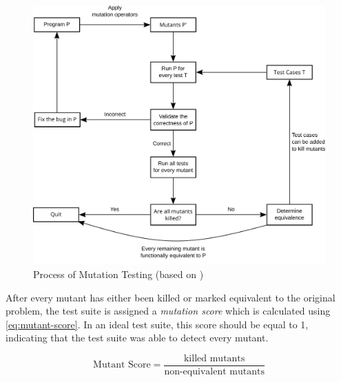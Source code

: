 \begin{figure}[htbp!]
	\centering
	\includegraphics[width=\textwidth]{assets/images/mutation-testing.pdf}
	\caption{Process of Mutation Testing (based on \cite{Offutt2001})}
	\label{fig:mutation-testing}
\end{figure}

\noindent After every mutant has either been killed or marked equivalent to the original problem, the test suite is assigned a \emph{mutation score} which is calculated using \autoref{eq:mutant-score}. In an ideal test suite, this score should be equal to 1, indicating that the test suite was able to detect every mutant. 

\begin{equation}\label{eq:mutant-score}
	\text{Mutant Score} = \frac{\text{killed mutants}}{\text{non-equivalent mutants}}
\end{equation}


